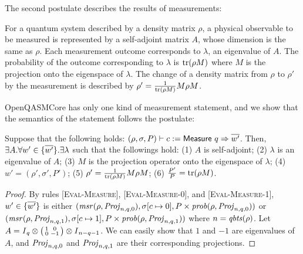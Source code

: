 The second postulate describes the results of measurements:
%
\begin{postulate}[Measurement]
	\label{pos:measurement}
	For a quantum system described by a density matrix $\rho$, a physical
	observable to be measured is represented by a self-adjoint matrix $A$, whose
	dimension is the same as $\rho$.
	Each measurement outcome corresponds to $\lambda$, an eigenvalue of $A$.
	The probability of the outcome corresponding to $\lambda$ is $\trace{\rho M}$
	where $M$ is the projection onto the eigenspace of $\lambda$.
	The change of a density matrix from $\rho$ to $\rho'$ by the measurement is
	described by $\rho'=\frac{1}{\trace{\rho M}}M\rho M$.
\end{postulate}
%
\noindent
%
OpenQASMCore has only one kind of measurement statement, and we show that the
semantics of the statement follows the postulate:
%
\begin{theorem}[Measurement]
	\label{thm:measure}
	Suppose that the following holds:
	$\eval{(\rho,\sigma,P)}{\imeasure{q}{c}}{\rep{w'}}$.
	Then, $\exists A.\forall w'\in\{\rep{w'}\}.\exists\lambda$ such that the
	followings hold:
	(1) $A$ is self-adjoint;
	(2) $\lambda$ is an eigenvalue of $A$;
	(3) $M$ is the projection operator onto the eigenspace of $\lambda$;
	(4) $w'=(\rho',\sigma',P')$;
	(5) $\rho'=\frac{1}{\trace{\rho M}}M\rho M$;
	(6) $\frac{P'}{P}=\trace{\rho M}$.
\end{theorem}
%
\begin{proof}
	By rules [\textsc{Eval-Measure}], [\textsc{Eval-Measure-0}], and
		[\textsc{Eval-Measure-1}], $w'\in\{\rep{w'}\}$ is either
	$(\smeasure{\rho}{\mproj{n,q,0}},\sigma[c\mapsto0],P\times\sprob{\rho}{\mproj{n,q,0}})$
	or
	$(\smeasure{\rho}{\mproj{n,q,1}},\sigma[c\mapsto1],P\times\sprob{\rho}{\mproj{n,q,1}})$
	where $n=\qubits{\rho}$.
	Let $A=\identity{q}\otimes\smtrx{1&0\\0&-1}\otimes\identity{n-q-1}$.
	We can easily show that $1$ and $-1$ are eigenvalues of $A$, and
	$\mproj{n,q,0}$ and $\mproj{n,q,1}$ are their corresponding projections.
\end{proof}

